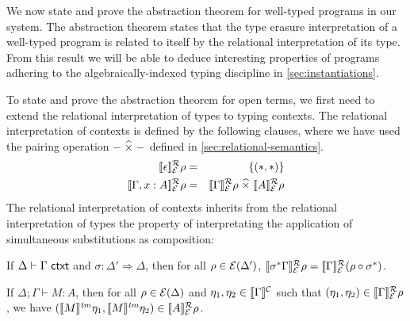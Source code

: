 We now state and prove the abstraction theorem for well-typed programs
in our system. The abstraction theorem states that the type erasure
interpretation of a well-typed program is related to itself by the
relational interpretation of its type. From this result we will be
able to deduce interesting properties of programs adhering to the
algebraically-indexed typing discipline in
\autoref{sec:instantiations}. %

To state and prove the abstraction theorem for open terms, we first
need to extend the relational interpretation of types to typing
contexts. The relational interpretation of contexts is defined by the
following clauses, where we have used the pairing operation
$-\mathrel{\widehat\times}-$ defined in \autoref{sec:relational-semantics}.
\begin{eqnarray*}
  \llbracket \epsilon \rrbracket^{\mathcal{R}}_{\mathcal{E}}{\rho} & = & \{(*,*)\} \\
  \llbracket \Gamma, x : A \rrbracket^{\mathcal{R}}_{\mathcal{E}}{\rho} & = & \llbracket \Gamma \rrbracket^{\mathcal{R}}_{\mathcal{E}}{\rho} \mathrel{\widehat\times} \llbracket A \rrbracket^{\mathcal{R}}_{\mathcal{E}}{\rho}
\end{eqnarray*}
The relational interpretation of contexts inherits from the relational
interpretation of types the property of interpretating the application
of simultaneous substitutions as composition:
\begin{lemma}\label{lem:ctxtsubst-rel}
  If $\Delta \vdash \Gamma \textsf{ ctxt}$ and $\sigma : \Delta' \Rightarrow
  \Delta$, then for all $\rho \in \mathcal{E}(\Delta')$,
  $\llbracket \sigma^*\Gamma \rrbracket^{\mathcal{R}}_{\mathcal{E}}{\rho} =
  \llbracket \Gamma \rrbracket^{\mathcal{R}}_{\mathcal{E}}{(\rho \circ \sigma^*)}$.
\end{lemma}

\begin{theorem}[Abstraction]
  If $\Delta; \Gamma \vdash M : A$, then for all $\rho \in
  \mathcal{E}(\Delta)$ and $\eta_1, \eta_2 \in \llbracket \Gamma \rrbracket^{\mathcal{C}}$ such
  that $(\eta_1, \eta_2) \in \llbracket \Gamma \rrbracket^{\mathcal{R}}_{\mathcal{E}}{\rho}$, we have
  $(\llbracket M \rrbracket^{\mathit{tm}}\eta_1, \llbracket M \rrbracket^{\mathit{tm}}\eta_2) \in \llbracket A \rrbracket^{\mathcal{R}}_{\mathcal{E}}{\rho}$.
\end{theorem}

